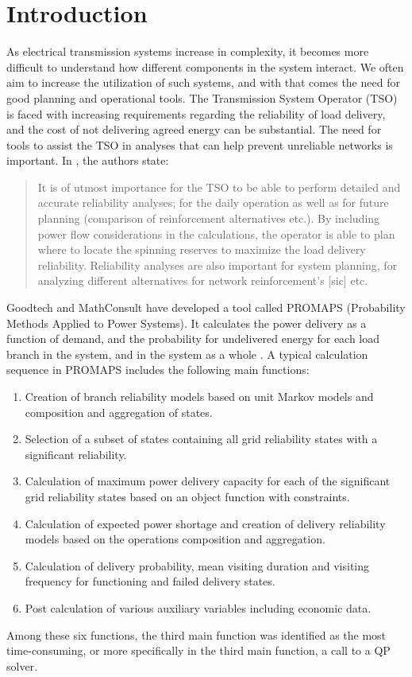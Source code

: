 \documentclass[a4paper,12pt]{report}
\begin{document}
\chapter{Introduction}
As electrical transmission systems increase in complexity, it becomes
more difficult to understand how different components in the system interact.
We often aim to increase the utilization of such systems, and with that comes
the need for good planning and operational tools.
The Transmission System Operator (TSO) is faced
with increasing requirements regarding the reliability of load
delivery, and the cost of not delivering agreed energy can be
substantial\cite{digernes}.
The need for tools to assist the TSO in analyses that can help prevent
unreliable networks is important.
In \cite{digernes}, the authors state:
\begin{quote}
It is of utmost importance for the TSO to be able to perform detailed and
accurate reliability analyses; for the daily operation as well as for
future planning (comparison of reinforcement alternatives etc.). By
including power flow considerations in the calculations, the operator is
able to plan where to locate the spinning reserves to maximize the load
delivery reliability. Reliability analyses are also important for system
planning, for analyzing different alternatives for network reinforcement's
[sic] etc.\cite{digernes}
\end{quote}

Goodtech and MathConsult have developed a tool called PROMAPS
(Probability Methods Applied to Power Systems). It calculates the power
delivery as a function of demand, and the probability for undelivered
energy for each load branch in the system, and in the system as a whole
\cite{trond}. A typical calculation sequence in PROMAPS includes the
following main functions\cite{trond}:
\begin{enumerate}
\item Creation of branch reliability models based on unit Markov models and
      composition and aggregation of states.
\item Selection of a subset of states containing all grid reliability states
      with a significant reliability.
\item Calculation of maximum power delivery capacity for each of the
      significant grid reliability states based on an object function with
      constraints.
\item Calculation of expected power shortage and creation of delivery
      reliability models based on the operations composition and aggregation.
\item Calculation of delivery probability, mean visiting duration and visiting
      frequency for functioning and failed delivery states.
\item Post calculation of various auxiliary variables including economic data.
\end{enumerate}
Among these six functions, the third main function was identified as the most
time-consuming, or more specifically in the third main function, a call to a QP
solver\cite{trond}.
\end{document}
